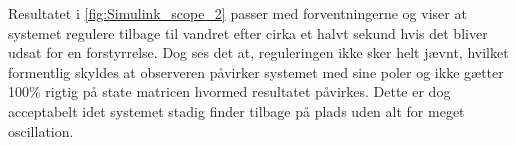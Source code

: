 Resultatet i \autoref{fig:Simulink_scope_2} passer med forventningerne og viser at systemet regulere tilbage til vandret efter cirka et halvt sekund hvis det bliver udsat for en forstyrrelse. Dog ses det at, reguleringen ikke sker helt jævnt, hvilket formentlig skyldes at observeren påvirker systemet med sine poler og ikke gætter 100\% rigtig på state matricen hvormed resultatet påvirkes. Dette er dog acceptabelt idet systemet stadig finder tilbage på plads uden alt for meget oscillation. 



